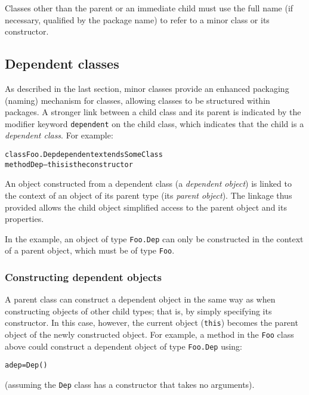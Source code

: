 Classes other than the parent or an immediate child must use the full
name (if necessary, qualified by the package name) to refer to a minor
class or its constructor.
\subsection{Dependent classes}\label{"id"}
\index{,}
\index{,}
\index{,}
 
As described in the last section, minor classes provide an enhanced
packaging (naming) mechanism for classes, allowing classes to be
structured within packages.  A stronger link between a child class and
its parent is indicated by the modifier keyword \texttt{dependent} on the
child class, which indicates that the child is a \emph{dependent class}.
For example:
\begin{alltt}
class Foo.Dep dependent extends SomeClass
  method Dep   -- this is the constructor
\end{alltt}
 
An object constructed from a dependent class (a \emph{dependent
object}) is linked to the context of an object of its parent
type (its \emph{parent object}).
The linkage thus provided allows the child object simplified access to
the parent object and its properties.
 
In the example, an object of type \texttt{Foo.Dep} can only be constructed
in the context of a parent object, which must be of type \texttt{Foo}.
\subsubsection{Constructing dependent objects}
 
A parent class can construct a dependent object in the same way as when
constructing objects of other child types; that is, by simply specifying
its constructor.  In this case, however, the current object
(\texttt{this}) becomes the parent object of the newly constructed object.
For example, a method in the \texttt{Foo} class above could construct a
dependent object of type \texttt{Foo.Dep} using:
\begin{alltt}
adep=Dep()
\end{alltt}
(assuming the \texttt{Dep} class has a constructor that takes no
arguments).
 
